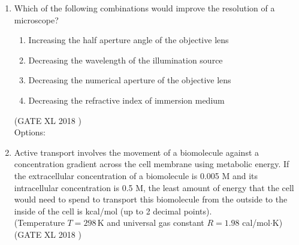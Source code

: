 \documentclass[14pt]{extarticle}
\begin{document}
\begin{flushleft}
\begin{enumerate}
\item Which of the following combinations would improve the resolution of a microscope?
\begin{enumerate}[label=(\roman*)]
  \item Increasing the half aperture angle of the objective lens
  \item Decreasing the wavelength of the illumination source
  \item Decreasing the numerical aperture of the objective lens
  \item Decreasing the refractive index of immersion medium
\end{enumerate}
\hfill(GATE XL 2018 )\\
Options:
\begin{enumerate}[label=(\Alph*)]
\end{enumerate}

\item Active transport involves the movement of a biomolecule against a concentration gradient across the cell membrane using metabolic energy. If the extracellular concentration of a biomolecule is 0.005 M and its intracellular concentration is 0.5 M, the least amount of energy that the cell would need to spend to transport this biomolecule from the outside to the inside of the cell is \underline{\hspace{4cm}} kcal/mol (up to 2 decimal points).\\
(Temperature $T = 298\,$K and universal gas constant $R = 1.98$ cal/mol$\cdot$K)
\hfill(GATE XL 2018 )\\


\end{enumerate}
\end{flushleft}
\end{document}
